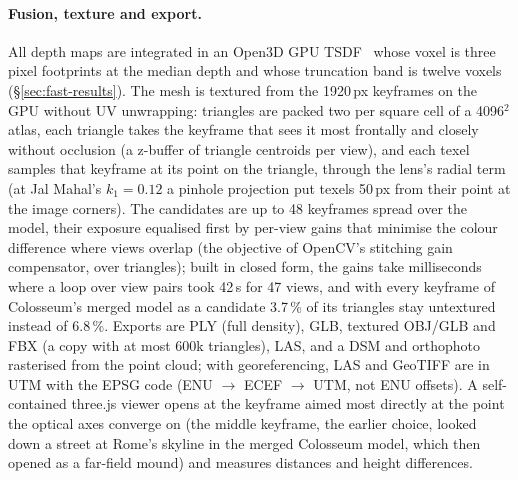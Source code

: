 \documentclass[10pt,a4paper,twocolumn]{article}
\begin{document}
\paragraph{Fusion, texture and export.} All depth maps are integrated in an Open3D GPU TSDF~\cite{curless1996volumetric,zhou2018open3d} whose voxel is three pixel footprints at the median depth and whose truncation band is twelve voxels (\S\ref{sec:fast-results}). The mesh is textured from the 1920\,px keyframes on the GPU without UV unwrapping: triangles are packed two per square cell of a 4096$^2$ atlas, each triangle takes the keyframe that sees it most frontally and closely without occlusion (a z-buffer of triangle centroids per view), and each texel samples that keyframe at its point on the triangle, through the lens's radial term (at Jal Mahal's $k_1=0.12$ a pinhole projection put texels 50\,px from their point at the image corners). The candidates are up to 48 keyframes spread over the model, their exposure equalised first by per-view gains that minimise the colour difference where views overlap (the objective of OpenCV's stitching gain compensator, over triangles); built in closed form, the gains take milliseconds where a loop over view pairs took 42\,s for 47 views, and with every keyframe of Colosseum's merged model as a candidate 3.7\,\% of its triangles stay untextured instead of 6.8\,\%. Exports are PLY (full density), GLB, textured OBJ/GLB and FBX (a copy with at most 600k triangles), LAS, and a DSM and orthophoto rasterised from the point cloud; with georeferencing, LAS and GeoTIFF are in UTM with the EPSG code (ENU $\to$ ECEF $\to$ UTM, not ENU offsets). A self-contained three.js viewer opens at the keyframe aimed most directly at the point the optical axes converge on (the middle keyframe, the earlier choice, looked down a street at Rome's skyline in the merged Colosseum model, which then opened as a far-field mound) and measures distances and height differences.
\end{document}
